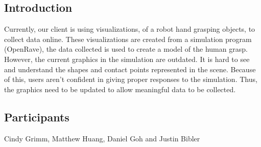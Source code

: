 \subsection{Introduction}
\vspace{3mm}
Currently, our client is using visualizations, of a robot hand grasping objects, to collect data online.
These visualizations are created from a simulation program (OpenRave), the data collected is used to create a model of the human grasp.
However, the current graphics in the simulation are outdated.
It is hard to see and understand the shapes and contact points represented in the scene.
Because of this, users aren't confident in giving proper responses to the simulation.
Thus, the graphics need to be updated to allow meaningful data to be collected. \\


\subsection{Participants}
\vspace{3mm}
Cindy Grimm, Matthew Huang, Daniel Goh and Justin Bibler \\ 

\newpage

